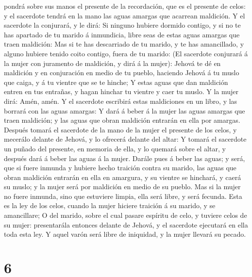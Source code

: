 pondrá sobre sus manos el presente de la recordación, que es el presente
de celos: y el sacerdote tendrá en la mano las aguas amargas que
acarrean maldición.  Y el sacerdote la conjurará, y le
dirá: Si ninguno hubiere dormido contigo, y si no te has apartado de tu
marido á inmundicia, libre seas de estas aguas amargas que traen
maldición:  Mas si te has descarriado de tu marido, y te
has amancillado, y alguno hubiere tenido coito contigo, fuera de tu
marido:  (El sacerdote conjurará á la mujer con juramento
de maldición, y dirá á la mujer): Jehová te dé en maldición y en
conjuración en medio de tu pueblo, haciendo Jehová á tu muslo que caiga,
y á tu vientre que se te hinche;  Y estas aguas que dan
maldición entren en tus entrañas, y hagan hinchar tu vientre y caer tu
muslo. Y la mujer dirá: Amén, amén.  Y el sacerdote
escribirá estas maldiciones en un libro, y las borrará con las aguas
amargas:  Y dará á beber á la mujer las aguas amargas que
traen maldición; y las aguas que obran maldición entrarán en ella por
amargas.  Después tomará el sacerdote de la mano de la
mujer el presente de los celos, y mecerálo delante de Jehová, y lo
ofrecerá delante del altar:  Y tomará el sacerdote un
puñado del presente, en memoria de ella, y lo quemará sobre el altar, y
después dará á beber las aguas á la mujer.  Darále pues á
beber las aguas; y será, que si fuere inmunda y hubiere hecho traición
contra su marido, las aguas que obran maldición entrarán en ella en
amargura, y su vientre se hinchará, y caerá su muslo; y la mujer será
por maldición en medio de su pueblo.  Mas si la mujer no
fuere inmunda, sino que estuviere limpia, ella será libre, y será
fecunda.  Esta es la ley de los celos, cuando la mujer
hiciere traición á su marido, y se amancillare;  O del
marido, sobre el cual pasare espíritu de celo, y tuviere celos de su
mujer: presentarála entonces delante de Jehová, y el sacerdote ejecutará
en ella toda esta ley.  Y aquel varón será libre de
iniquidad, y la mujer llevará su pecado.

\hypertarget{section-5}{%
\section{6}\label{section-5}}

